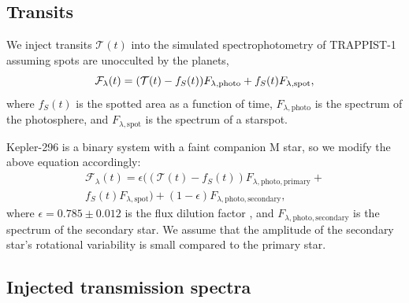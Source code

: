 
\subsection{Transits}

We inject \citet{Mandel2002} transits $\mathcal{T}(t)$ into the simulated spectrophotometry of TRAPPIST-1 assuming spots are unocculted by the planets,
\begin{equation}
\mathcal{F}_{\lambda}(t) = (\mathcal{T}(t) - f_S(t))F_{\lambda, \mathrm{photo}} +\\
f_S(t) F_{\lambda, \mathrm{spot}},
\end{equation}
where $f_S(t)$ is the spotted area as a function of time, $F_{\lambda, \mathrm{photo}}$ is the spectrum of the photosphere, and $F_{\lambda, \mathrm{spot}}$ is the spectrum of a starspot. 


Kepler-296 is a binary system with a faint companion M star, so we modify the above equation accordingly:
\begin{multline}
\mathcal{F}_{\lambda}(t) = \epsilon ( (\mathcal{T}(t) - f_S(t))F_{\lambda, \mathrm{photo, primary}} +\\f_S(t) F_{\lambda, \mathrm{spot}} ) + (1 - \epsilon) F_{\lambda, \mathrm{photo, secondary}},
\end{multline}
where $\epsilon = 0.785 \pm 0.012$ is the flux dilution factor \citep{Barclay2015}, and $F_{\lambda, \mathrm{photo, secondary}}$ is the spectrum of the secondary star. We assume that the amplitude of the secondary star's rotational variability is small compared to the primary star.

\subsection{Injected transmission spectra}



